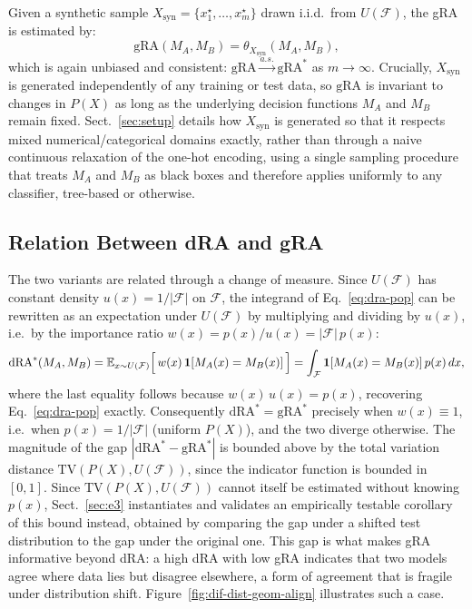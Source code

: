 \documentclass[runningheads]{llncs}
\begin{document}
Given a synthetic sample $X_\text{syn} = \{x_1^\star, \ldots, x_m^\star\}$ drawn i.i.d.\ from $U(\mathcal{F})$, the gRA is estimated by:
\begin{equation}
  \label{eq:gra}
  \mathrm{gRA}(M_A, M_B) = \theta_{X_\text{syn}}(M_A, M_B),
\end{equation}
which is again unbiased and consistent: $\mathrm{gRA} \xrightarrow{a.s.} \mathrm{gRA}^*$ as $m \to \infty$. Crucially, $X_\text{syn}$ is generated independently of any training or test data, so $\mathrm{gRA}$ is invariant to changes in $P(X)$ as long as the underlying decision functions $M_A$ and $M_B$ remain fixed. Sect.~\ref{sec:setup} details how $X_\text{syn}$ is generated so that it respects mixed numerical/categorical domains exactly, rather than through a naive continuous relaxation of the one-hot encoding, using a single sampling procedure that treats $M_A$ and $M_B$ as black boxes and therefore applies uniformly to any classifier, tree-based or otherwise.

\subsection{Relation Between dRA and gRA}
\label{sec:variants}

The two variants are related through a change of measure. Since $U(\mathcal{F})$ has constant density $u(x) = 1/|\mathcal{F}|$ on $\mathcal{F}$, the integrand of Eq.~\eqref{eq:dra-pop} can be rewritten as an expectation under $U(\mathcal{F})$ by multiplying and dividing by $u(x)$, i.e.\ by the importance ratio $w(x) = p(x)/u(x) = |\mathcal{F}|\,p(x)$:
\begin{equation}
  \label{eq:relation}
  \mathrm{dRA}^*(M_A, M_B)
  = \mathbb{E}_{x \sim U(\mathcal{F})}\Bigl[\, w(x)\, \mathbf{1}[M_A(x) = M_B(x)] \,\Bigr]
  = \int_{\mathcal{F}} \mathbf{1}[M_A(x) = M_B(x)]\, p(x)\, dx,
\end{equation}
where the last equality follows because $w(x)\, u(x) = p(x)$, recovering Eq.~\eqref{eq:dra-pop} exactly. Consequently $\mathrm{dRA}^* = \mathrm{gRA}^*$ precisely when $w(x) \equiv 1$, i.e.\ when $p(x) = 1/|\mathcal{F}|$ (uniform $P(X)$), and the two diverge otherwise. The magnitude of the gap $|\mathrm{dRA}^* - \mathrm{gRA}^*|$ is bounded above by the total variation distance $\mathrm{TV}(P(X), U(\mathcal{F}))$, since the indicator function is bounded in $[0,1]$. Since $\mathrm{TV}(P(X), U(\mathcal{F}))$ cannot itself be estimated without knowing $p(x)$, Sect.~\ref{sec:e3} instantiates and validates an empirically testable corollary of this bound instead, obtained by comparing the gap under a shifted test distribution to the gap under the original one. This gap is what makes gRA informative beyond dRA: a high dRA with low gRA indicates that two models agree where data lies but disagree elsewhere, a form of agreement that is fragile under distribution shift. Figure~\ref{fig:dif-dist-geom-align} illustrates such a case.
\end{document}
